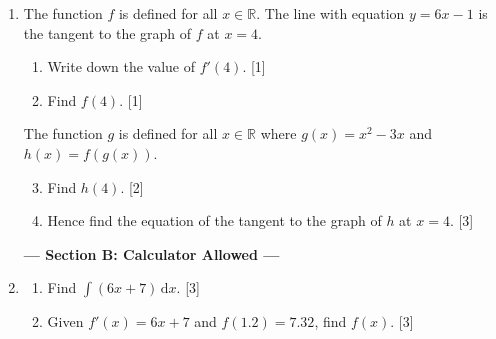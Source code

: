 \documentclass[12pt, twoside]{article}
\begin{document}
\begin{enumerate}[itemsep=0.15cm]
\newpage

\item[5.] [Maximum mark: 7]

The function $f$ is defined for all $x \in \mathbb{R}$. The line with equation
$y = 6x - 1$ is the tangent to the graph of $f$ at $x = 4$.

\begin{enumerate}[itemsep=0.1cm]
  \item Write down the value of $f'(4)$. \hfill [1]
  \item Find $f(4)$. \hfill [1]
\end{enumerate}

The function $g$ is defined for all $x \in \mathbb{R}$ where
$g(x) = x^{2} - 3x$ and $h(x) = f\!\left(g(x)\right)$.

\begin{enumerate}[itemsep=0.1cm]
  \setcounter{enumii}{2}
  \item Find $h(4)$. \hfill [2]
  \item Hence find the equation of the tangent to the graph of $h$ at $x = 4$. \hfill [3]
\end{enumerate}


\newpage

\begin{center}\textbf{--- Section B: Calculator Allowed ---}\end{center}

\item[6.] [Maximum mark: 6]

\begin{enumerate}[itemsep=0.1cm]
  \item Find $\displaystyle\int(6x+7)\,\mathrm{d}x$. \hfill [3]
  \item Given $f'(x) = 6x + 7$ and $f(1.2) = 7.32$, find $f(x)$. \hfill [3]
\end{enumerate}



\end{enumerate}
\end{document}
